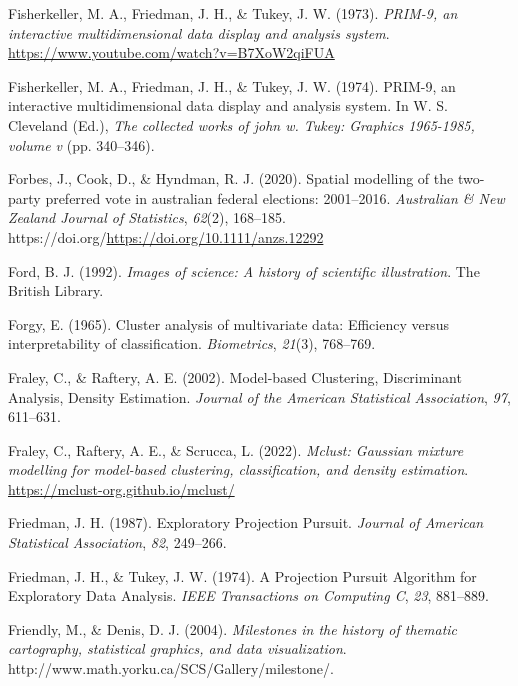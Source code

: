 \documentclass[
  letterpaper,
]{krantz}
\newlength{\cslhangindent}
\newlength{\cslentryspacingunit} %
\newenvironment{CSLReferences}[2] %
 {%
  \setlength{\parindent}{0pt}
  \ifodd #1
  \let\oldpar\par
  \def\par{\hangindent=\cslhangindent\oldpar}
  \fi
  \setlength{\parskip}{#2\cslentryspacingunit}
 }%
 {}
\begin{document}
\begin{CSLReferences}{1}{0}
\leavevmode{}%
Fisherkeller, M. A., Friedman, J. H., \& Tukey, J. W. (1973).
\emph{{PRIM-9}, an interactive multidimensional data display and
analysis system}. \url{https://www.youtube.com/watch?v=B7XoW2qiFUA}

\leavevmode{}%
Fisherkeller, M. A., Friedman, J. H., \& Tukey, J. W. (1974). {PRIM-9},
an interactive multidimensional data display and analysis system. In W.
S. Cleveland (Ed.), \emph{The collected works of john w. Tukey: Graphics
1965-1985, volume v} (pp. 340--346).

\leavevmode{}%
Forbes, J., Cook, D., \& Hyndman, R. J. (2020). Spatial modelling of the
two-party preferred vote in australian federal elections: 2001--2016.
\emph{Australian \& New Zealand Journal of Statistics}, \emph{62}(2),
168--185. https://doi.org/\url{https://doi.org/10.1111/anzs.12292}

\leavevmode{}%
Ford, B. J. (1992). \emph{Images of science: A history of scientific
illustration}. The British Library.

\leavevmode{}%
Forgy, E. (1965). Cluster analysis of multivariate data: Efficiency
versus interpretability of classification. \emph{Biometrics},
\emph{21}(3), 768--769.

\leavevmode{}%
Fraley, C., \& Raftery, A. E. (2002). Model-based {C}lustering,
{D}iscriminant {A}nalysis, {D}ensity {E}stimation. \emph{Journal of the
American Statistical Association}, \emph{97}, 611--631.

\leavevmode{}%
Fraley, C., Raftery, A. E., \& Scrucca, L. (2022). \emph{Mclust:
Gaussian mixture modelling for model-based clustering, classification,
and density estimation}. \url{https://mclust-org.github.io/mclust/}

\leavevmode{}%
Friedman, J. H. (1987). {E}xploratory {P}rojection {P}ursuit.
\emph{Journal of American Statistical Association}, \emph{82}, 249--266.

\leavevmode{}%
Friedman, J. H., \& Tukey, J. W. (1974). {A} {P}rojection {P}ursuit
{A}lgorithm for {E}xploratory {D}ata {A}nalysis. \emph{IEEE Transactions
on Computing C}, \emph{23}, 881--889.

\leavevmode{}%
Friendly, M., \& Denis, D. J. (2004). \emph{Milestones in the history of
thematic cartography, statistical graphics, and data visualization}.
http://www.math.yorku.ca/SCS/Gallery/milestone/.


\end{CSLReferences}
\end{document}
